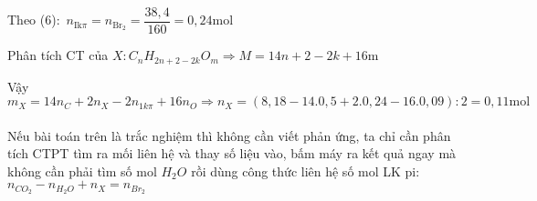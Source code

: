\begin{vd}
{\begin{itemize}
			Theo (6)$\colon$ $n_{\mathrm{Ik} \pi}=n_{\mathrm{Br}_2}=\dfrac{38,4}{160}=0,24\mathrm{mol}$
			
			Phân tích CT của $X: C_n H_{2n+2-2k} O_m \Rightarrow M=14n+2-2k+16\mathrm{m}$
			
			Vậy $m_X=14n_C+2n_X-2n_{1k \pi}+16n_O \Rightarrow n_X=(8,18-14.0,5+2.0,24-16.0,09): 2=0,11\mathrm{mol}$
			\\\\%
			 Nếu bài toán trên là trắc nghiệm thì không cần viết phản ứng, ta chỉ cần phân tích CTPT tìm ra mối liên hệ và thay số liệu vào, bấm máy ra kết quả ngay mà không cần phải tìm số mol $H_2O$ rồi dùng công thức liên hệ số mol LK pi: $n_{CO_2}-n_{H_2O}+n_X=n_{{Br}_2}$
		\end{itemize}
	}
\end{vd}

